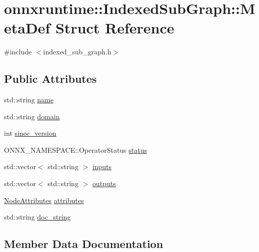 \hypertarget{structonnxruntime_1_1IndexedSubGraph_1_1MetaDef}{}\section{onnxruntime\+:\+:Indexed\+Sub\+Graph\+:\+:Meta\+Def Struct Reference}
\label{structonnxruntime_1_1IndexedSubGraph_1_1MetaDef}


{\ttfamily \#include $<$indexed\+\_\+sub\+\_\+graph.\+h$>$}

\subsection*{Public Attributes}
\begin{DoxyCompactItemize}
\item 
std\+::string \mbox{\hyperlink{structonnxruntime_1_1IndexedSubGraph_1_1MetaDef_aaa0ea00fd962baff7055e0bc925720e1}{name}}
\item 
std\+::string \mbox{\hyperlink{structonnxruntime_1_1IndexedSubGraph_1_1MetaDef_a93c5fe6a6a15c4c36501fa88f5b8fbae}{domain}}
\item 
int \mbox{\hyperlink{structonnxruntime_1_1IndexedSubGraph_1_1MetaDef_a84b4761d426f12c383515db23147bffd}{since\+\_\+version}}
\item 
O\+N\+N\+X\+\_\+\+N\+A\+M\+E\+S\+P\+A\+C\+E\+::\+Operator\+Status \mbox{\hyperlink{structonnxruntime_1_1IndexedSubGraph_1_1MetaDef_a026af043d1fa30e73e200a9823418633}{status}}
\item 
std\+::vector$<$ std\+::string $>$ \mbox{\hyperlink{structonnxruntime_1_1IndexedSubGraph_1_1MetaDef_a810e668abe88822f89127af7740b9650}{inputs}}
\item 
std\+::vector$<$ std\+::string $>$ \mbox{\hyperlink{structonnxruntime_1_1IndexedSubGraph_1_1MetaDef_ad3bdd942c43979e2f38391f114b0379e}{outputs}}
\item 
\mbox{\hyperlink{namespaceonnxruntime_a7fa616c461850e300cfa552afd46eed4}{Node\+Attributes}} \mbox{\hyperlink{structonnxruntime_1_1IndexedSubGraph_1_1MetaDef_acce2fd1ac434bace5b337f8fb722c4d9}{attributes}}
\item 
std\+::string \mbox{\hyperlink{structonnxruntime_1_1IndexedSubGraph_1_1MetaDef_afb2298bfac3544dca07c3bf72f476817}{doc\+\_\+string}}
\end{DoxyCompactItemize}


\subsection{Member Data Documentation}
\mbox{\label{structonnxruntime_1_1IndexedSubGraph_1_1MetaDef_acce2fd1ac434bace5b337f8fb722c4d9}} 
